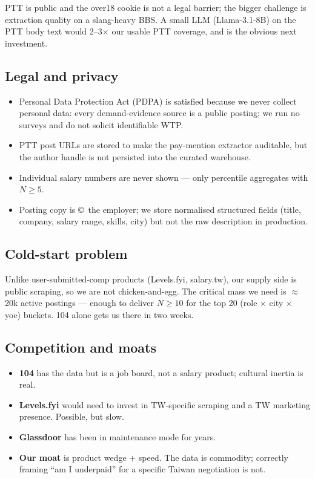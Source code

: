 \documentclass[11pt,a4paper]{article}
\begin{document}
PTT is public and the over18 cookie is not a legal barrier; the bigger
challenge is extraction quality on a slang-heavy BBS. A small LLM
(Llama-3.1-8B) on the PTT body text would 2--3$\times$ our usable PTT
coverage, and is the obvious next investment.

\subsection*{Legal and privacy}
\begin{itemize}[leftmargin=*,itemsep=0.1em,topsep=0.2em]
  \item Personal Data Protection Act (PDPA) is satisfied because we never
    collect personal data: every demand-evidence source is a public
    posting; we run no surveys and do not solicit identifiable WTP.
  \item PTT post URLs are stored to make the pay-mention extractor
    auditable, but the author handle is not persisted into the
    curated warehouse.
  \item Individual salary numbers are never shown --- only percentile
    aggregates with $N\geq 5$.
  \item Posting copy is \copyright\ the employer; we store normalised
    structured fields (title, company, salary range, skills, city) but
    not the raw description in production.
\end{itemize}

\subsection*{Cold-start problem}
Unlike user-submitted-comp products (Levels.fyi, salary.tw), our supply
side is public scraping, so we are not chicken-and-egg. The critical mass
we need is $\approx$20k active postings --- enough to deliver $N\geq 10$
for the top 20 (role $\times$ city $\times$ yoe) buckets. 104 alone gets
us there in two weeks.

\subsection*{Competition and moats}
\begin{itemize}[leftmargin=*,itemsep=0.1em,topsep=0.2em]
  \item \textbf{104} has the data but is a job board, not a salary
    product; cultural inertia is real.
  \item \textbf{Levels.fyi} would need to invest in TW-specific scraping
    and a TW marketing presence. Possible, but slow.
  \item \textbf{Glassdoor} has been in maintenance mode for years.
  \item \textbf{Our moat} is product wedge + speed. The data is
    commodity; correctly framing ``am I underpaid'' for a specific
    Taiwan negotiation is not.
\end{itemize}
\end{document}
